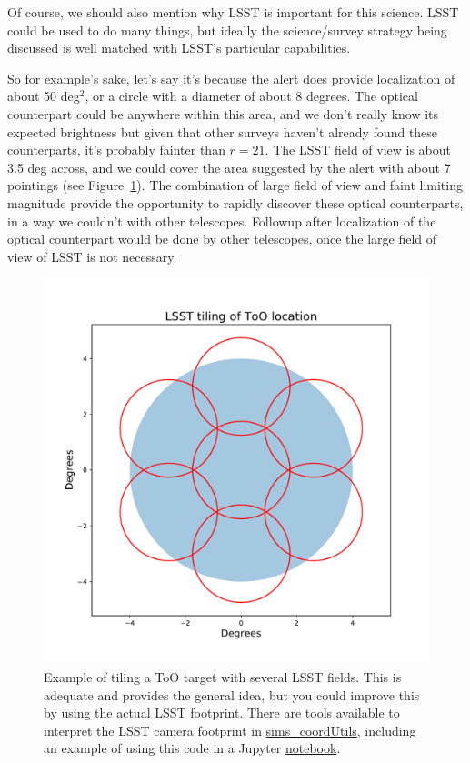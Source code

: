 \documentclass[12pt, letterpaper]{article}
\begin{document}
Of course, we should also mention why LSST is important for this science. LSST could be used 
to do many things, but ideally the science/survey strategy being discussed is well matched with LSST's particular
capabilities. 

So for example's sake, let's say it's because the alert does provide localization of about 50 deg$^2$, or a circle with 
a diameter of about 8 degrees. The optical counterpart could be anywhere within this area, and we don't really know its
expected brightness but given that other surveys haven't already found these counterparts, it's probably fainter than $r=21$. 
The LSST field of view is about 3.5 deg across, and we could cover the area suggested by the alert with about 7 pointings
(see Figure~\ref{fig:tiling}).  The combination of large field of view and faint limiting magnitude provide the opportunity
to rapidly discover these optical counterparts, in a way we couldn't with other telescopes. 
Followup after localization of the optical counterpart would be done by other telescopes, once the large field of view
of LSST is not necessary.


\begin{figure}
\includegraphics[width=1.1\textwidth]{ToO_tiling}
\caption{Example of tiling a ToO target with several LSST fields.  This is adequate and provides the general idea, but you could improve this 
by using the actual LSST footprint. There are tools available to interpret the LSST camera footprint in 
\href{https://github.com/lsst/sims_coordUtils}{sims\_coordUtils}, 
including an example of using this code in a Jupyter 
\href{https://github.com/lsst/sims_coordUtils/blob/master/examples/CameraUtilsExample.ipynb}{notebook}.
 \label{fig:tiling}}
\end{figure}
\end{document}

